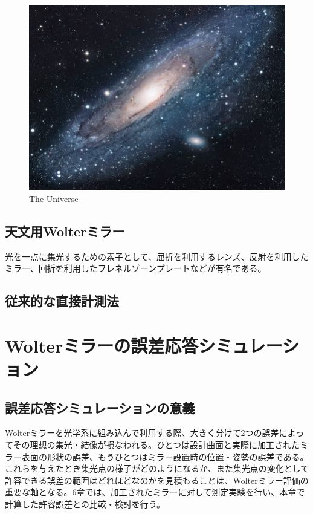 \documentclass[dvipdfmx,autodetect-engine]{jreport}
\begin{document}
\begin{figure}[h!]
\centering
\includegraphics[scale=1.7]{images/utility/universe.jpg}
\caption{The Universe}
\label{fig:universe}
\end{figure}

\section{天文用Wolterミラー}
光を一点に集光するための素子として、屈折を利用するレンズ、反射を利用したミラー、回折を利用したフレネルゾーンプレートなどが有名である。

\section{従来的な直接計測法}

\newpage
\chapter{Wolterミラーの誤差応答シミュレーション}

\newpage
\section{誤差応答シミュレーションの意義}
Wolterミラーを光学系に組み込んで利用する際、大きく分けて2つの誤差によってその理想の集光・結像が損なわれる。ひとつは設計曲面と実際に加工されたミラー表面の形状の誤差、もうひとつはミラー設置時の位置・姿勢の誤差である。
これらを与えたとき集光点の様子がどのようになるか、また集光点の変化として許容できる誤差の範囲はどれほどなのかを見積もることは、Wolterミラー評価の重要な軸となる。6章では、加工されたミラーに対して測定実験を行い、本章で計算した許容誤差との比較・検討を行う。
\end{document}
